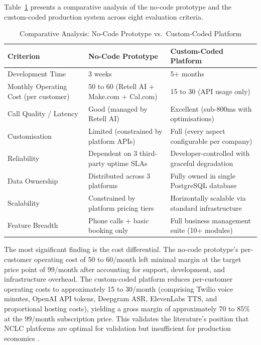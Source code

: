 \documentclass[conference]{IEEEtran}
\begin{document}
Table~\ref{tab:comparison} presents a comparative analysis of the no-code prototype and the custom-coded production system across eight evaluation criteria.

\begin{table}[htbp]
\caption{Comparative Analysis: No-Code Prototype vs.\ Custom-Coded Platform}
\begin{center}
\begin{tabular}{lll}
\toprule
\textbf{Criterion} & \textbf{No-Code Prototype} & \textbf{Custom-Coded Platform} \\
\midrule
Development Time & 3 weeks & 5+ months \\
Monthly Operating Cost (per customer) & \texteuro{}50 to \texteuro{}60 (Retell AI + Make.com + Cal.com) & \texteuro{}15 to \texteuro{}30 (API usage only) \\
Call Quality / Latency & Good (managed by Retell AI) & Excellent (sub-800ms with optimisations) \\
Customisation & Limited (constrained by platform APIs) & Full (every aspect configurable per company) \\
Reliability & Dependent on 3 third-party uptime SLAs & Developer-controlled with graceful degradation \\
Data Ownership & Distributed across 3 platforms & Fully owned in single PostgreSQL database \\
Scalability & Constrained by platform pricing tiers & Horizontally scalable via standard infrastructure \\
Feature Breadth & Phone calls + basic booking only & Full business management suite (10+ modules) \\
\bottomrule
\end{tabular}
\label{tab:comparison}
\end{center}
\end{table}

The most significant finding is the cost differential. The no-code prototype's per-customer operating cost of \texteuro{}50 to \texteuro{}60/month left minimal margin at the target price point of \texteuro{}99/month after accounting for support, development, and infrastructure overhead. The custom-coded platform reduces per-customer operating costs to approximately \texteuro{}15 to \texteuro{}30/month (comprising Twilio voice minutes, OpenAI API tokens, Deepgram ASR, ElevenLabs TTS, and proportional hosting costs), yielding a gross margin of approximately 70 to 85\% at the \texteuro{}99/month subscription price. This validates the literature's position that NCLC platforms are optimal for validation but insufficient for production economics \cite{b2}.
\end{document}
